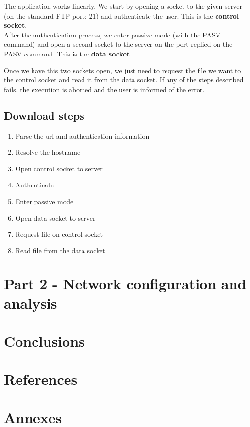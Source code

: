 \documentclass[11pt]{report}
\begin{document}
The application works linearly. We start by opening a socket to the given
server (on the standard FTP port: 21) and authenticate the user. This is
the \textbf{control socket}.\\
After the authentication process, we enter passive mode (with the PASV
command) and open a second socket to the server on the port replied on
the PASV command. This is the \textbf{data socket}.

Once we have this two sockets open, we just need to request the file
we want to the control socket and read it from the data socket. If any
of the steps described fails, the execution is aborted and the user is
informed of the error.

\section{Download steps}
\begin{enumerate}
\item Parse the url and authentication information
\item Resolve the hostname
\item Open control socket to server
\item Authenticate
\item Enter passive mode
\item Open data socket to server
\item Request file on control socket
\item Read file from the data socket
\end{enumerate}

\chapter{Part 2 - Network configuration and analysis}

\chapter{Conclusions}

\chapter{References}

\chapter{Annexes}
\end{document}
